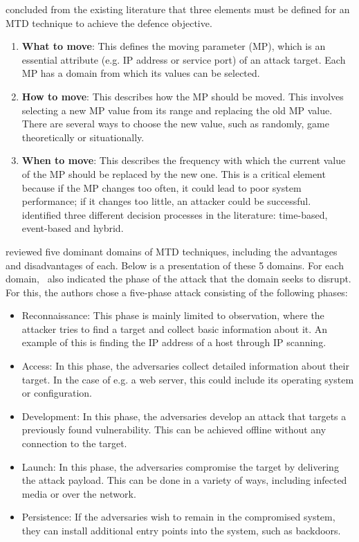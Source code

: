 \cite{article:Cai} concluded from the existing literature that three elements must be defined for an MTD technique to achieve the defence objective. 
\begin{enumerate}
    \item \textbf{What to move}: This defines the moving parameter (MP), which is an essential attribute (e.g. IP address or service port) of an attack target. Each MP has a domain from which its values can be selected. 
    \item \textbf{How to move}: This describes how the MP should be moved. This involves selecting a new MP value from its range and replacing the old MP value. There are several ways to choose the new value, such as randomly, game theoretically or situationally.   
    \item \textbf{When to move}: This describes the frequency with which the current value of the MP should be replaced by the new one. This is a critical element because if the MP changes too often, it could lead to poor system performance; if it changes too little, an attacker could be successful.~\cite{navas:2021MTDWhere} identified three different decision processes in the literature: time-based, event-based and hybrid.
\end{enumerate}


\cite{article:okhraviFindingFocus} reviewed five dominant domains of MTD techniques, including the advantages and disadvantages of each. Below is a presentation of these 5 domains. For each domain,~\cite{article:okhraviFindingFocus} also indicated the phase of the attack that the domain seeks to disrupt. For this, the authors chose a five-phase attack consisting of the following phases: 
\begin{itemize}
    \item Reconnaissance: This phase is mainly limited to observation, where the attacker tries to find a target and collect basic information about it. An example of this is finding the IP address of a host through IP scanning.
    \item Access: In this phase, the adversaries collect detailed information about their target. In the case of e.g. a web server, this could include its operating system or configuration. 
    \item Development: In this phase, the adversaries develop an attack that targets a previously found vulnerability. This can be achieved offline without any connection to the target. 
    \item Launch: In this phase, the adversaries compromise the target by delivering the attack payload. This can be done in a variety of ways, including infected media or over the network.
    \item Persistence: If the adversaries wish to remain in the compromised system, they can install additional entry points into the system, such as backdoors. 
\end{itemize}

